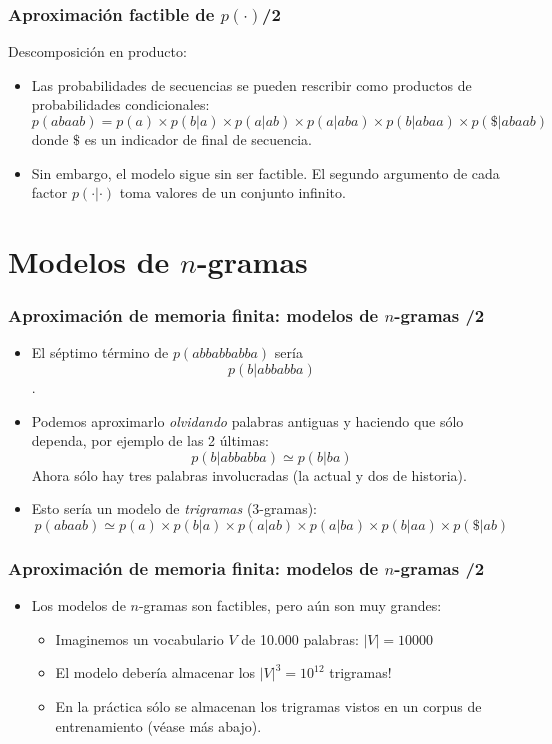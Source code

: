 \begin{frame}
  \frametitle{Aproximación factible de \(p(\cdot)\)/2}
  Descomposición en producto:
  

  \begin{itemize}
  \item Las probabilidades de secuencias se pueden rescribir como productos de probabilidades condicionales:
\[p(abaab)=p(a)\times p(b|a) \times p(a|ab) \times p(a|aba) \times p(b|abaa) \times p(\$|abaab)\]
donde \(\$\) es un indicador de final de secuencia.
  \item Sin embargo, el modelo sigue sin ser factible. El segundo argumento de cada factor \(p(\cdot|\cdot)\) toma valores de un conjunto infinito.
  \end{itemize}
\end{frame}

\section{Modelos de \(n\)-gramas}
\begin{frame}
  \frametitle{Aproximación de memoria finita: modelos de \(n\)-gramas /2}
  \begin{itemize}
  \item El séptimo término de \(p(abbabbabba)\) sería
\[p(b|abbabba)\]. 
  \item Podemos aproximarlo \emph{olvidando} palabras antiguas y haciendo que sólo dependa, por ejemplo de las 2 últimas:
  \[p(b|abbabba)\simeq p(b|ba)\]
  Ahora sólo hay tres palabras involucradas (la actual y dos de historia).
  \item Esto sería un modelo de \emph{trigramas} (3-gramas):
\[p(abaab) \simeq p(a)\times p(b|a) \times p(a|ab) \times p(a|ba) \times p(b|aa) \times p(\$|ab)\]

  \end{itemize}

\end{frame}

\begin{frame}
  \frametitle{Aproximación de memoria finita: modelos de \(n\)-gramas /2}
  \begin{itemize}
  \item Los modelos de \(n\)-gramas son factibles, pero aún son muy grandes:
    \begin{itemize}
    \item Imaginemos un vocabulario \(V\) de 10.000 palabras: \(|V|=10000\)
    \item El modelo debería almacenar los \(|V|^3=10^{12}\) trigramas!
    \item En la práctica sólo se almacenan los trigramas vistos en un corpus de entrenamiento (véase más abajo).
    \end{itemize}
  \end{itemize}

\end{frame}


